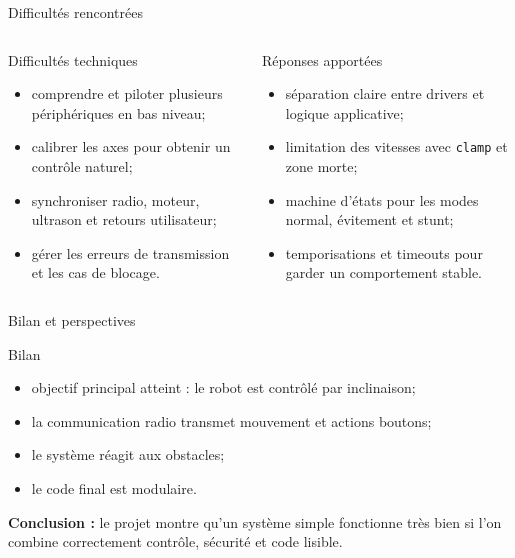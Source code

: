\documentclass[aspectratio=169]{beamer}
\begin{document}
\begin{frame}{Difficult\'es rencontr\'ees}
  \begin{columns}[T,onlytextwidth]
    \begin{block}{Difficult\'es techniques}
      \begin{itemize}
        \item comprendre et piloter plusieurs p\'eriph\'eriques en bas niveau;
        \item calibrer les axes pour obtenir un contr\^ole naturel;
        \item synchroniser radio, moteur, ultrason et retours utilisateur;
        \item g\'erer les erreurs de transmission et les cas de blocage.
      \end{itemize}
    \end{block}

    \begin{block}{R\'eponses apport\'ees}
      \begin{itemize}
        \item s\'eparation claire entre drivers et logique applicative;
        \item limitation des vitesses avec \texttt{clamp} et zone morte;
        \item machine d'\'etats pour les modes normal, \'evitement et stunt;
        \item temporisations et timeouts pour garder un comportement stable.
      \end{itemize}
    \end{block}
  \end{columns}

  \vspace{0.35cm}
\end{frame}

\begin{frame}{Bilan et perspectives}
  \begin{block}{Bilan}
    \begin{itemize}
      \item objectif principal atteint : le robot est contr\^ol\'e par inclinaison;
      \item la communication radio transmet mouvement et actions boutons;
      \item le syst\`eme r\'eagit aux obstacles;
      \item le code final est modulaire.
    \end{itemize}
  \end{block}



  \vspace{0.25cm}
  \centering
  \textbf{Conclusion :} le projet montre qu'un syst\`eme simple fonctionne tr\`es bien si l'on combine correctement contr\^ole, s\'ecurit\'e et code lisible.
\end{frame}
\end{document}
